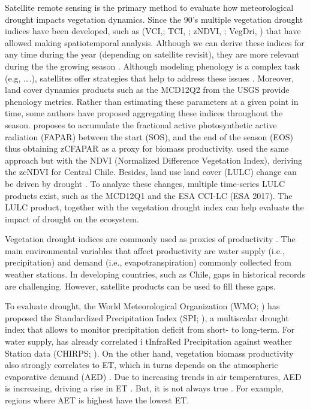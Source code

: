 \documentclass[
  number,
  preprint,
  3p]{elsarticle}
\begin{document}
Satellite remote sensing \citep{West2019, AghaKouchak2015} is the
primary method to evaluate how meteorological drought impacts vegetation
dynamics. Since the 90's multiple vegetation drought indices have been
developed, such as (VCI,\citep{Kogan1990}; TCI, \citep{Kogan1995};
zNDVI, \citep{Peters2002}; VegDri, \citep{Brown2008}) that have allowed
making spatiotemporal analysis. Although we can derive these indices for
any time during the year (depending on satellite revisit), they are more
relevant during the the growing season \citep{Mishra2015}. Although
modeling phenology is a complex task (e.g, \ldots.), satellites offer
strategies that help to address these issues
\citep{Younes2021, Vrieling2018, Cai2017}. Moreover, land cover dynamics
products such as the MCD12Q2 from the USGS \citep{Friedl2019} provide
phenology metrics. Rather than estimating these parameters at a given
point in time, some authors have proposed aggregating these indices
throughout the season. \citep{Meroni2017} proposes to accumulate the
fractional active photosynthetic active radiation (FAPAR) between the
start (SOS), and the end of the season (EOS) thus obtaining zCFAPAR as a
proxy for biomass productivity. \citep{Zambrano2018} used the same
approach but with the NDVI (Normalized Difference Vegetation Index),
deriving the zcNDVI for Central Chile. Besides, land use land cover
(LULC) change can be driven by drought \citep{Tran2019, Akinyemi2021}.
To analyze these changes, multiple time-series LULC products exist, such
as the MCD12Q1 \citep{Friedl2019} and the ESA CCI-LC (ESA 2017). The
LULC product, together with the vegetation drought index can help
evaluate the impact of drought on the ecosystem.

Vegetation drought indices are commonly used as proxies of productivity
\citep{Paruelo2016, Schucknecht2017}. The main environmental variables
that affect productivity are water supply (i.e., precipitation) and
demand (i.e., evapotranspiration)\citep{Mishra2015} commonly collected
from weather stations. In developing countries, such as Chile, gaps in
historical records are challenging. However, satellite products can be
used to fill these gaps.

To evaluate drought, the World Meteorological Organization (WMO;
\citep{WMO2012}) has proposed the Standardized Precipitation Index (SPI;
\citep{Mckee1993}), a multiscalar drought index that allows to monitor
precipitation deficit from short- to long-term. For water supply,
\citep{Zambrano2017} has already correlated i tInfraRed Precipitation
against weather Station data (CHIRPS; \citep{Funk2015}). On the other
hand, vegetation biomass productivity also strongly correlates to ET,
which in turns depends on the atmospheric evaporative demand (AED)
\citep{FAO66, Pereira2015, Allen2005}. Due to increasing trends in air
temperatures, AED is increasing, driving a rise in ET
\citep{IPCCCH112021}. But, it is not always true \citep{Milly2016}. For
example, regions where AET is highest have the lowest ET.
\end{document}
